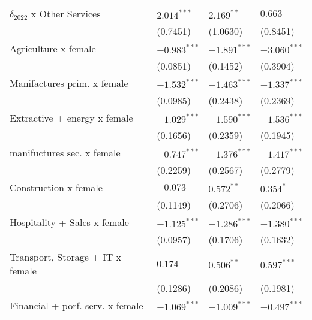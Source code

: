 \begin{tabular}{llll}
$\delta_{2022}$ x Other Services                   &      $2.014^{***}$ &       $2.169^{**}$ &            $0.663$ \\
                                                   &           (0.7451) &           (1.0630) &           (0.8451) \\
Agriculture x female                               &     $-0.983^{***}$ &     $-1.891^{***}$ &     $-3.060^{***}$ \\
                                                   &           (0.0851) &           (0.1452) &           (0.3904) \\
Manifactures prim. x female                        &     $-1.532^{***}$ &     $-1.463^{***}$ &     $-1.337^{***}$ \\
                                                   &           (0.0985) &           (0.2438) &           (0.2369) \\
Extractive + energy x female                       &     $-1.029^{***}$ &     $-1.590^{***}$ &     $-1.536^{***}$ \\
                                                   &           (0.1656) &           (0.2359) &           (0.1945) \\
manifuctures sec. x female                         &     $-0.747^{***}$ &     $-1.376^{***}$ &     $-1.417^{***}$ \\
                                                   &           (0.2259) &           (0.2567) &           (0.2779) \\
Construction x female                              &           $-0.073$ &       $0.572^{**}$ &          $0.354^*$ \\
                                                   &           (0.1149) &           (0.2706) &           (0.2066) \\
Hospitality + Sales x female                       &     $-1.125^{***}$ &     $-1.286^{***}$ &     $-1.380^{***}$ \\
                                                   &           (0.0957) &           (0.1706) &           (0.1632) \\
Transport, Storage + IT x female                   &            $0.174$ &       $0.506^{**}$ &      $0.597^{***}$ \\
                                                   &           (0.1286) &           (0.2086) &           (0.1981) \\
Financial + porf. serv. x female                   &     $-1.069^{***}$ &     $-1.009^{***}$ &     $-0.497^{***}$ \\

\end{tabular}
